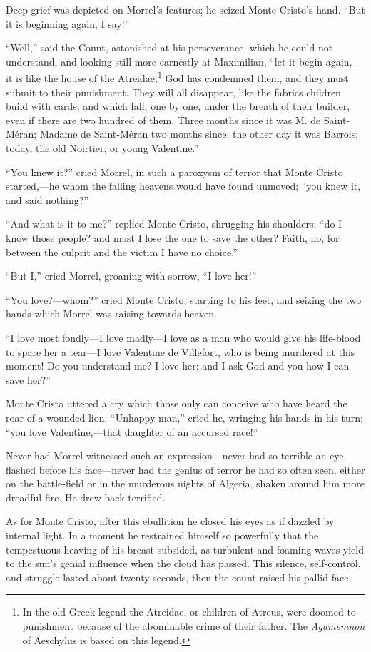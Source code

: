 Deep grief was depicted on Morrel’s features; he seized Monte Cristo’s
hand. “But it is beginning again, I say!”

“Well,” said the Count, astonished at his perseverance, which he could
not understand, and looking still more earnestly at Maximilian, “let it
begin again,—it is like the house of the Atreidae;\footnote[19]{In the
old Greek legend the Atreidae, or children of Atreus, were doomed to
punishment because of the abominable crime of their father. The
\textit{Agamemnon} of Aeschylus is based on this legend.} God has condemned
them, and they must submit to their punishment. They will all
disappear, like the fabrics children build with cards, and which fall,
one by one, under the breath of their builder, even if there are two
hundred of them. Three months since it was M. de Saint-Méran; Madame de
Saint-Méran two months since; the other day it was Barrois; today, the
old Noirtier, or young Valentine.”

“You knew it?” cried Morrel, in such a paroxysm of terror that Monte
Cristo started,—he whom the falling heavens would have found unmoved;
“you knew it, and said nothing?”

“And what is it to me?” replied Monte Cristo, shrugging his shoulders;
“do I know those people? and must I lose the one to save the other?
Faith, no, for between the culprit and the victim I have no choice.”

“But I,” cried Morrel, groaning with sorrow, “I love her!”

“You love?—whom?” cried Monte Cristo, starting to his feet, and seizing
the two hands which Morrel was raising towards heaven.

“I love most fondly—I love madly—I love as a man who would give his
life-blood to spare her a tear—I love Valentine de Villefort, who is
being murdered at this moment! Do you understand me? I love her; and I
ask God and you how I can save her?”

Monte Cristo uttered a cry which those only can conceive who have heard
the roar of a wounded lion. “Unhappy man,” cried he, wringing his hands
in his turn; “you love Valentine,—that daughter of an accursed race!”

Never had Morrel witnessed such an expression—never had so terrible an
eye flashed before his face—never had the genius of terror he had so
often seen, either on the battle-field or in the murderous nights of
Algeria, shaken around him more dreadful fire. He drew back terrified.

As for Monte Cristo, after this ebullition he closed his eyes as if
dazzled by internal light. In a moment he restrained himself so
powerfully that the tempestuous heaving of his breast subsided, as
turbulent and foaming waves yield to the sun’s genial influence when
the cloud has passed. This silence, self-control, and struggle lasted
about twenty seconds, then the count raised his pallid face.

